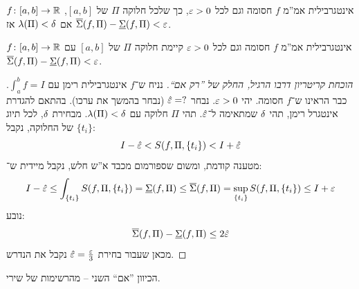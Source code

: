 \documentclass[]{../../../../tex/classes/styledArticle}
\newcommand\daru{\ol{\Sigma}}
\newcommand\dard{\underline{\Sigma}}
\begin{document}
	
	
	\begin{Theorem}
		$f \colon [a, b] \to \mathbb{R}$ אינטגרבילית אמ''מ $f$ חסומה וגם לכל $\eg > 0$, כך שלכל חלוקה $\Pi$ של $[a, b]$, אם $\lambda(\Pi) < \delta$ אז $\daru(f, \Pi) - \dard(f, \Pi) < \eg$. 
	\end{Theorem}
	\begin{Theorem}
		$f \colon [a, b] \to \mathbb{R}$ אינטגרבילית אמ''מ $f$ חסומה וגם לכל $\eg > 0$ קיימת חלוקה $\Pi$ של $[a, b]$ עם $\daru(f, \Pi) - \dard(f, \Pi) < \eg$. 
	\end{Theorem}
	
	\begin{proof}[הוכחת קריטריון דרבו הרגיל, החלק של ''רק אם``]
		נניח ש־$f$ אינטגרבילית רימן עם $\int^{b}_a f = I$. כבר הראינו ש־$f$ חסומה. יהי $\eg > 0$. נבחר $\hat \eg = ?$ (נבחר בהמשך את ערכו). בהתאם להגדרת אינטגרל רימן, תהי $\delta$ שמתאימה ל־$\hat \eg$. תהי $\Pi$ חלוקה עם $\lambda(\Pi) < \delta$. מבחירת $\delta$, לכל תיוג $\{t_i\}$ של החלוקה, נקבל: 
		\[ I - \hat \eg < S(f, \Pi, \{t_i\}) < I + \hat \eg \]
		מטענה קודמת, ומשום שספורמום מכבד א''ש חלש, נקבל מיידית ש־: 
		\[ I - \hat \eg \le \int_{\{t_i\}} S(f, \Pi, \{t_i\}) = \dard(f, \Pi) \le \daru(f, \Pi) = \sup_{\{t_i\}} S(f, \Pi, \{t_i\}) \le I + \eg \]
		נובע: 
		\[ \daru(f, \Pi) - \dard(f, \Pi) \le 2 \hat \eg \]
		מכאן שעבור בחירת $\hat \eg = \frac{\eg}{3}$ נקבל את הנדרש. 
	\end{proof}
	הכיוון ''אם`` השני – מהרשימות של שירי. 
	
	
	
	
	
	\ndoc
\end{document}
